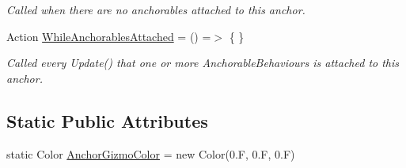\begin{DoxyCompactItemize}
\begin{DoxyCompactList}\small\item\em Called when there are no anchorables attached to this anchor. \end{DoxyCompactList}\item 
Action \mbox{\hyperlink{class_leap_1_1_unity_1_1_interaction_1_1_anchor_af4206b9e6f47ad010b61035b4bc5fe5f}{While\+Anchorables\+Attached}} = () =$>$ \{ \}
\begin{DoxyCompactList}\small\item\em Called every Update() that one or more Anchorable\+Behaviours is attached to this anchor. \end{DoxyCompactList}\end{DoxyCompactItemize}
\subsection*{Static Public Attributes}
\begin{DoxyCompactItemize}
\item 
static Color \mbox{\hyperlink{class_leap_1_1_unity_1_1_interaction_1_1_anchor_a642b2c2841df3da969f01f30d6b4e528}{Anchor\+Gizmo\+Color}} = new Color(0.\+F, 0.\+F, 0.\+F)
\end{DoxyCompactItemize}

